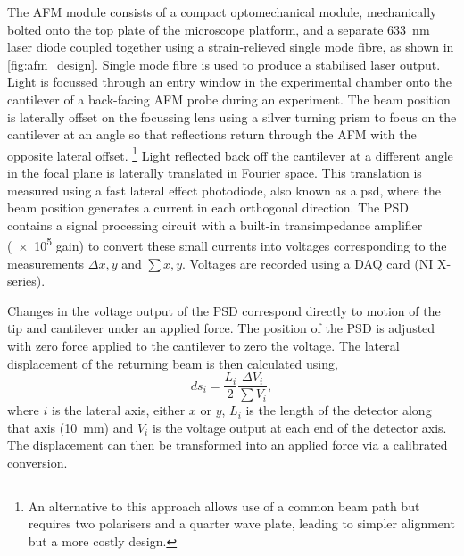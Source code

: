 \documentclass{article}
\begin{document}
The AFM module consists of a compact optomechanical module, mechanically bolted onto the top plate of the microscope platform, and a separate \SI{633}{nm} laser diode coupled together using a strain-relieved single mode fibre, as shown in \autoref{fig:afm_design}. Single mode fibre is used to produce a stabilised laser output.%
Light is focussed through an entry window in the experimental chamber onto the cantilever of a back-facing AFM probe during an experiment. The beam position is laterally offset on the focussing lens using a silver turning prism to focus on the cantilever at an angle so that reflections return through the AFM with the opposite lateral offset.%
\footnote{An alternative to this approach allows use of a common beam path but requires two polarisers and a quarter wave plate, leading to simpler alignment but a more costly design.}
Light reflected back off the cantilever at a different angle in the focal plane is laterally translated in Fourier space. This translation is measured using a fast lateral effect photodiode, also known as a \gls{psd}, where the beam position generates a current in each orthogonal direction. The PSD contains a signal processing circuit with a built-in transimpedance amplifier (\num{e5} gain) to convert these small currents into voltages corresponding to the measurements $\Delta x,y$ and $\sum x,y$. Voltages are recorded using a DAQ card (NI X-series).

Changes in the voltage output of the PSD correspond directly to motion of the tip and cantilever under an applied force. The position of the PSD is adjusted with zero force applied to the cantilever to zero the voltage. The lateral displacement of the returning beam is then calculated using,
\begin{equation}
ds_i = \frac{L_i}{2}\frac{\Delta V_i}{\sum V_i},
\end{equation}
where $i$ is the lateral axis, either $x$ or $y$, $L_i$ is the length of the detector along that axis (\SI{10}{mm}) and $V_i$ is the voltage output at each end of the detector axis. The displacement can then be transformed into an applied force via a calibrated conversion.
\end{document}
